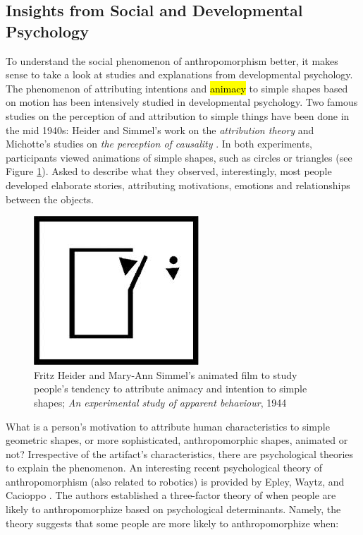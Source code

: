 \documentclass{frontiersSCNS} %
\begin{document}
\subsection{Insights from Social and Developmental Psychology}
\label{sec:psychological-factors}

To understand the social phenomenon of anthropomorphism better, it makes sense
to take a look at studies and explanations from developmental psychology. The
phenomenon of attributing intentions and \hl{animacy} to simple shapes based on
motion has been intensively studied in developmental psychology. Two famous
studies on the perception of and attribution to simple things have been done in
the mid 1940s: Heider and Simmel's work on the \textit{attribution theory}
\cite{heider_experimental_1944} and Michotte's studies on \textit{the perception
of causality} \cite{michotte_perception_1963}. In both experiments, participants
viewed animations of simple shapes, such as circles or triangles (see Figure
\ref{fig:animacy_attribution}). Asked to describe what they observed,
interestingly, most people developed elaborate stories, attributing motivations,
emotions and relationships between the objects.

\begin{figure}\centering
  \includegraphics[scale=0.6]{heider-simmel_animation.jpeg}
 \caption{Fritz Heider and Mary-Ann Simmel's animated film to study people's tendency to attribute animacy and intention to simple shapes; \textit{An experimental study of apparent behaviour}, 1944}
 \label{fig:animacy_attribution}       %
 \end{figure}

What is a person's motivation to attribute human characteristics to simple
geometric shapes, or more sophisticated, anthropomorphic shapes, animated or
not? Irrespective of the artifact's characteristics, there are psychological
theories to explain the phenomenon. An interesting recent psychological theory
of anthropomorphism (also related to robotics) is provided by Epley, Waytz, and
Cacioppo \cite{epley_seeing_2007}. The authors established a three-factor theory
of when people are likely to anthropomorphize based on psychological
determinants. Namely, the theory suggests that some people are more likely to
anthropomorphize when:
\end{document}
